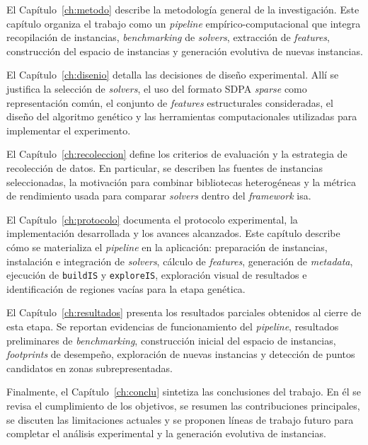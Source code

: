 El Capítulo~\ref{ch:metodo} describe la metodología general de la investigación.
Este capítulo organiza el trabajo como un \textit{pipeline} empírico-computacional que integra
recopilación de instancias, \textit{benchmarking} de \textit{solvers}, extracción de \textit{features}, construcción
del espacio de instancias y generación evolutiva de nuevas instancias.

El Capítulo~\ref{ch:disenio} detalla las decisiones de diseño experimental.
Allí se justifica la selección de \textit{solvers}, el uso del formato SDPA \textit{sparse} como
representación común, el conjunto de \textit{features} estructurales consideradas, el diseño del
algoritmo genético y las herramientas computacionales utilizadas para implementar el
experimento.

El Capítulo~\ref{ch:recoleccion} define los criterios de evaluación y la estrategia de
recolección de datos.
En particular, se describen las fuentes de instancias seleccionadas, la motivación para
combinar bibliotecas heterogéneas y la métrica de rendimiento usada para comparar
\textit{solvers} dentro del \textit{framework} \acrshort{isa}.

El Capítulo~\ref{ch:protocolo} documenta el protocolo experimental, la implementación
desarrollada y los avances alcanzados.
Este capítulo describe cómo se materializa el \textit{pipeline} en la aplicación: preparación de
instancias, instalación e integración de \textit{solvers}, cálculo de \textit{features}, generación de
\textit{metadata}, ejecución de \texttt{buildIS} y \texttt{exploreIS}, exploración visual de
resultados e identificación de regiones vacías para la etapa genética.

El Capítulo~\ref{ch:resultados} presenta los resultados parciales obtenidos al cierre
de esta etapa.
Se reportan evidencias de funcionamiento del \textit{pipeline}, resultados preliminares de
\textit{benchmarking}, construcción inicial del espacio de instancias, \textit{footprints} de desempeño,
exploración de nuevas instancias y detección de puntos candidatos en zonas
subrepresentadas.

Finalmente, el Capítulo~\ref{ch:conclu} sintetiza las conclusiones del trabajo.
En él se revisa el cumplimiento de los objetivos, se resumen las contribuciones
principales, se discuten las limitaciones actuales y se proponen líneas de trabajo
futuro para completar el análisis experimental y la generación evolutiva de instancias.
